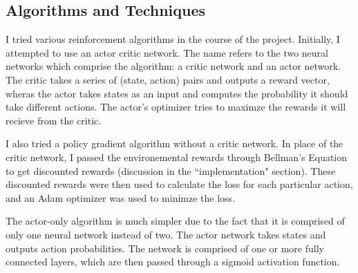 \documentclass[12pt,a4paper]{article}
\begin{document}
%
\subsection*{Algorithms and Techniques}

I tried various reinforcement algorithms in the course of the project. Initially, I attempted to use an actor critic network. The name refers to the two neural networks which comprise the algorithm: a critic network and an actor network. The critic takes a series of (state, action) pairs and outputs a reward vector, wheras the actor takes states as an input and computes the probability it should take different actions. The actor's optimizer tries to maximze the rewards it will recieve from the critic. 

I also tried a policy gradient algorithm without a critic network. In place of the critic network, I passed the environemental rewards through Bellman's Equation to get discounted rewards (discussion in the ``implementation" section). These discounted rewards were then used to calculate the loss for each particular action, and an Adam optimizer was used to minimze the loss.

The actor-only algorithm is much simpler due to the fact that it is comprised of only one neural network instead of two. The actor network takes states and outputs action probabilities. The network is comprised of one or more fully connected layers, which are then passed through a sigmoid activation function.
\end{document}
